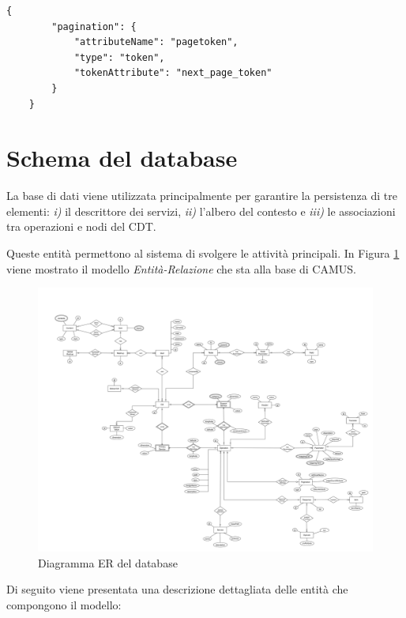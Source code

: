 \begin{lstlisting}[style=blocco-esempi,
								caption=Esempio di descrittore della paginazione,
								label=lst:esempio-descrittore-paginazione]
	{
		"pagination": {
			"attributeName": "pagetoken",
			"type": "token",
			"tokenAttribute": "next_page_token"
		}
	}
\end{lstlisting}

\section{Schema del database\label{sec:schema-database}}

La base di dati viene utilizzata principalmente per garantire la persistenza di tre elementi: \emph{i)} il descrittore dei servizi, \emph{ii)} l'albero del contesto e \emph{iii)} le associazioni tra operazioni e nodi del CDT.

Queste entità permettono al sistema di svolgere le attività principali. In Figura \ref{fig:schema-er-db} viene mostrato il modello \emph{Entità-Relazione} che sta alla base di CAMUS.

\begin{figure}[ht]
	\centering
	\includegraphics[width=\textwidth]{5-implementazione-backend/Immagini/schema_er_db.png}
	\caption{Diagramma ER del database}\label{fig:schema-er-db}
\end{figure}

Di seguito viene presentata una descrizione dettagliata delle entità che compongono il modello:

